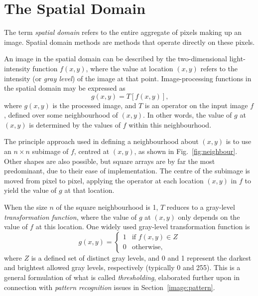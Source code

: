
\section{The Spatial Domain}
\label{image:spatial}

The term {\em spatial domain\/} refers to the entire aggregate of
pixels making up an image.  Spatial domain methods are methods that
operate directly on these pixels.

An image in the spatial domain can be described by the two-dimensional
light-intensity function $f(x,y)$, where the value at location $(x,y)$
refers to the intensity (or {\em gray level\/}) of the image at that
point.  Image-processing functions in the spatial domain may be
expressed as
\begin{equation}
\label{eq:spatial_operator}
g(x,y)=T[f(x,y)]\mbox{,}
\end{equation}
where $g(x,y)$ is the processed image, and $T$ is an operator on the
input image $f$, defined over some neighbourhood of $(x,y)$.  In other
words, the value of $g$ at $(x,y)$ is determined by the values of $f$
within this neighbourhood.


The principle approach used in defining a neighbourhood about $(x,y)$
is to use an $n\times n$ subimage of $f$, centred at $(x,y)$, as shown
in Fig.~\ref{fig:neighbour}.  Other shapes are also possible, but
square arrays are by far the most predominant, due to their ease of
implementation.  The centre of the subimage is moved from pixel to
pixel, applying the operator at each location $(x,y)$ in $f$ to yield
the value of $g$ at that location.

When the size $n$ of the square neighbourhood is 1, $T$ reduces to a
gray-level {\em transformation function\/}, where the value of $g$ at
$(x,y)$ only depends on the value of $f$ at this location.  One widely
used gray-level transformation function is
\begin{equation}
\label{eq:threshold}
  g(x,y)=\left\{ \begin{array}{ll} 
                   1 & \mbox{if $f(x,y)\in Z$} \\ 
                   0 & \mbox{otherwise,}
                 \end{array} \right.
\end{equation}
where $Z$ is a defined set of distinct gray levels, and 0 and 1
represent the darkest and brightest allowed gray levels, respectively
(typically 0 and 255).  This is a general formulation of what is
called {\em thresholding\/}, elaborated further upon in connection
with {\em pattern recognition\/} issues in
Section~\ref{image:pattern}.

